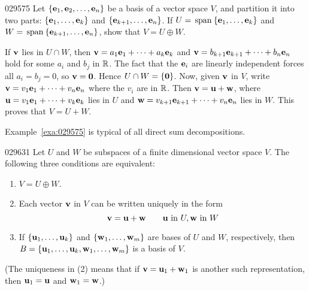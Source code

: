 \begin{example}{}{029575}
Let $\{\textbf{e}_{1}, \textbf{e}_{2}, \dots, \textbf{e}_{n}\}$ be a basis of a vector space $V$, and partition it into two parts: $\{\textbf{e}_{1}, \dots, \textbf{e}_{k}\}$ and $\{\textbf{e}_{k+1}, \dots, \textbf{e}_{n}\}$. If $U = \thinspace\operatorname{span\medspace}\{\textbf{e}_{1}, \dots, \textbf{e}_{k}\}$ and $W = \thinspace\operatorname{span\medspace}\{\textbf{e}_{k+1}, \dots, \textbf{e}_{n}\}$, show that $V = U \oplus W$.


\begin{solution}
  If $\textbf{v}$ lies in $U \cap W$, then $\textbf{v} = a_{1}\textbf{e}_{1} + \cdots + a_{k}\textbf{e}_{k}$ and $\textbf{v} = b_{k+1}\textbf{e}_{k+1} + \cdots + b_{n}\textbf{e}_{n}$ hold for some $a_{i}$ and $b_{j}$ in $\mathbb{R}$. The fact that the $\textbf{e}_{i}$ are linearly independent forces all $a_{i} = b_{j} = 0$, so $\textbf{v} = \textbf{0}$. Hence $U \cap W = \{\textbf{0}\}$. Now, given $\textbf{v}$ in $V$, write $\textbf{v} = v_{1}\textbf{e}_{1} + \cdots + v_{n}\textbf{e}_{n}$ where the $v_{i}$ are in $\mathbb{R}$. Then $\textbf{v} = \textbf{u} + \textbf{w}$, where $\textbf{u} = v_{1}\textbf{e}_{1} + \cdots + v_{k}\textbf{e}_{k}$ lies in $U$ and $\textbf{w} = v_{k+1}\textbf{e}_{k+1} + \cdots + v_{n}\textbf{e}_{n}$ lies in $W$. This proves that $V = U + W$.
\end{solution}
\end{example}

Example~\ref{exa:029575} is typical of all direct sum decompositions.


\begin{theorem}{}{029631}
Let $U$ and $W$ be subspaces of a finite dimensional vector space $V$. The following three conditions are equivalent:
\begin{enumerate}
\item $V = U \oplus W$.

\item Each vector $\textbf{v}$ in $V$ can be written uniquely in the form
\begin{equation*}
\textbf{v} = \textbf{u} + \textbf{w} \qquad \textbf{u} \mbox{ in } U, \textbf{w} \mbox{ in } W
\end{equation*}
\item If $\{\textbf{u}_{1}, \dots, \textbf{u}_{k}\}$ and $\{\textbf{w}_{1}, \dots, \textbf{w}_{m}\}$ are bases of $U$ and $W$, respectively, then $B = \{\textbf{u}_{1}, \dots, \textbf{u}_{k}, \textbf{w}_{1}, \dots, \textbf{w}_{m}\}$ is a basis of $V$.

\end{enumerate}

(The uniqueness in (2) means that if $\textbf{v} = \textbf{u}_{1} + \textbf{w}_{1}$ is another such representation, then $\textbf{u}_{1} = \textbf{u}$ and $\textbf{w}_{1} = \textbf{w}$.)
\end{theorem}

